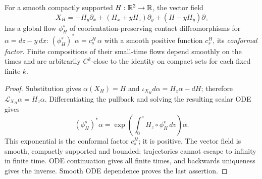 \begin{lemma}\label{fd:contact-motions}
For a smooth compactly supported $H:\mathbb R^3\to\mathbb R$, the vector field
\begin{equation}
 X_H=-H_y\partial_x+(H_x+yH_z)\partial_y+(H-yH_y)\partial_z
\end{equation}
has a global flow $\phi_H^s$ of coorientation-preserving contact
diffeomorphisms for $\alpha=dz-y\,dx$: $(\phi_H^s)^*\alpha=c^H_s\,\alpha$
with a smooth positive function $c^H_s$, its \emph{conformal factor}. Finite compositions of their
small-time flows depend smoothly on the times and are arbitrarily
$C^k$-close to the identity on compact sets for each fixed finite $k$.
\end{lemma}
\begin{proof}
Substitution gives $\alpha(X_H)=H$ and
$\iota_{X_H}d\alpha=H_z\alpha-dH$; therefore
$\mathcal L_{X_H}\alpha=H_z\alpha$. Differentiating the pullback and
solving the resulting scalar ODE gives
\begin{equation}
 (\phi_H^s)^*\alpha
 =\exp\left(\int_0^s H_z\circ\phi_H^v\,dv\right)\alpha.
\end{equation}
This exponential is the conformal factor $c^H_s$; it is positive. The vector field is smooth, compactly supported
and bounded; trajectories cannot escape to infinity in finite time.
ODE continuation gives all finite times, and backwards uniqueness gives
the inverse. Smooth ODE dependence proves the last assertion.
\end{proof}


